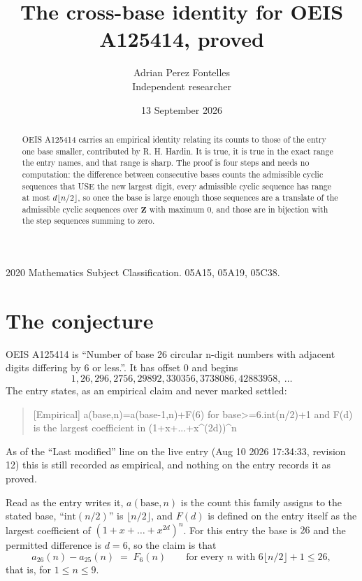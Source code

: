 \documentclass[11pt,a4paper]{article}
\title{The cross-base identity for OEIS A125414, proved}
\author{Adrian Perez Fontelles\\ \small Independent researcher}
\date{13 September 2026}
\theoremstyle{plain}
\theoremstyle{definition}
\begin{document}
\maketitle

\begin{abstract}
OEIS A125414 carries an empirical identity relating its counts to those of the entry one base
smaller, contributed by R. H. Hardin. It is true, it is true in the exact range the entry
names, and that range is sharp. The proof is four steps and needs no computation: the
difference between consecutive bases counts the admissible cyclic sequences that USE the new
largest digit, every admissible cyclic sequence has range at most $d\lfloor n/2\rfloor$, so
once the base is large enough those sequences are a translate of the admissible cyclic
sequences over $\mathbf{Z}$ with maximum $0$, and those are in bijection with the step
sequences summing to zero.
\end{abstract}

\noindent\small 2020 Mathematics Subject Classification. 05A15, 05A19, 05C38.\normalsize

\section{The conjecture}

OEIS A125414 is ``Number of base 26 circular n-digit numbers with adjacent digits differing by 6 or less.''. It has offset $0$ and begins
\[
1, 26, 296, 2756, 29892, 330356, 3738086, 42883958,\ \dots
\]
The entry states, as an empirical claim and never marked settled:
\begin{quote}
[Empirical] a(base,n)=a(base-1,n)+F(6) for base>=6.int(n/2)+1 and F(d) is the largest coefficient in (1+x+...+x\textasciicircum{}(2d))\textasciicircum{}n
\end{quote}
As of the ``Last modified'' line on the live entry (Aug 10 2026 17:34:33, revision 12)
this is still recorded as empirical, and nothing on the entry records it as proved.

Read as the entry writes it, $a(\mathrm{base},n)$ is the count this family assigns to the
stated base, ``$\mathrm{int}(n/2)$'' is $\lfloor n/2\rfloor$, and $F(d)$ is defined on the
entry itself as the largest coefficient of $(1+x+\dots+x^{2d})^{n}$. For this entry
the base is $26$ and the permitted difference is $d=6$, so the claim is that
\[
a_{26}(n)-a_{25}(n)\;=\;F_{6}(n)
\qquad\text{for every } n \text{ with } 6\lfloor n/2\rfloor+1\le26,
\]
that is, for $1\le n\le9$.
\end{document}
